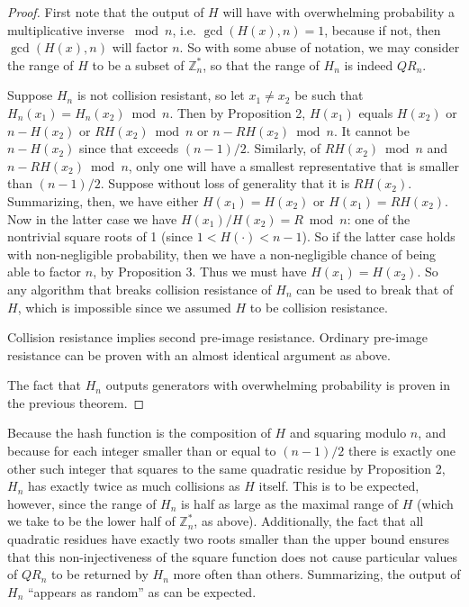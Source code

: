 \documentclass[a4paper,12pt]{article}
\newcommand{\Z}{\mathbb{Z}}
\begin{document}
\begin{proof}
First note that the output of $H$ will have with overwhelming probability a multiplicative inverse ${}\bmod n$, i.e. $\gcd(H(x), n) = 1$, because if not, then $\gcd(H(x), n)$ will factor $n$. So with some abuse of notation, we may consider the range of $H$ to be a subset of $\Z^*_n$, so that the range of $H_n$ is indeed $QR_n$.

Suppose $H_n$ is not collision resistant, so let $x_1 \neq x_2$ be such that $H_n(x_1) = H_n(x_2) \bmod n$. Then by Proposition 2, $H(x_1)$ equals $H(x_2)$ or $n - H(x_2)$ or $RH(x_2) \bmod n$ or $n - RH(x_2) \bmod n$. It cannot be $n - H(x_2)$ since that exceeds $(n-1)/2$. Similarly, of $RH(x_2) \bmod n$ and $n - RH(x_2) \bmod n$, only one will have a smallest representative that is smaller than $(n-1)/2$. Suppose without loss of generality that it is $RH(x_2)$. Summarizing, then, we have either $H(x_1) = H(x_2)$ or $H(x_1) = RH(x_2)$. Now in the latter case we have $H(x_1)/H(x_2) = R \bmod n$: one of the nontrivial square roots of 1 (since $1 < H(\cdot) < n-1$). So if the latter case holds with non-negligible probability, then we have a non-negligible chance of being able to factor $n$, by Proposition 3. Thus we must have $H(x_1) = H(x_2)$. So any algorithm that breaks collision resistance of $H_n$ can be used to break that of $H$, which is impossible since we assumed $H$ to be collision resistance.

Collision resistance implies second pre-image resistance. Ordinary pre-image resistance can be proven with an almost identical argument as above.

The fact that $H_n$ outputs generators with overwhelming probability is proven in the previous theorem.
\end{proof}

\noindent Because the hash function is the composition of $H$ and squaring modulo $n$, and because for each integer smaller than or equal to $(n-1)/2$ there is exactly one other such integer that squares to the same quadratic residue by Proposition 2, $H_n$ has exactly twice as much collisions as $H$ itself. This is to be expected, however, since the range of $H_n$ is half as large as the maximal range of $H$ (which we take to be the lower half of $\Z^*_n$, as above). Additionally, the fact that all quadratic residues have exactly two roots smaller than the upper bound ensures that this non-injectiveness of the square function does not cause particular values of $QR_n$ to be returned by $H_n$ more often than others. Summarizing, the output of $H_n$ ``appears as random'' as can be expected.
\end{document}
